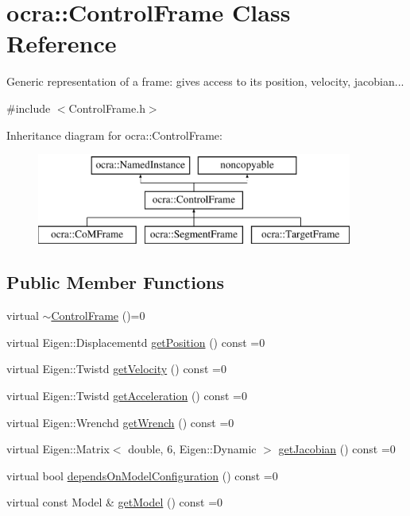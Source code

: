 \hypertarget{classocra_1_1ControlFrame}{}\section{ocra\+:\+:Control\+Frame Class Reference}
\label{classocra_1_1ControlFrame}


Generic representation of a frame\+: gives access to its position, velocity, jacobian...  




{\ttfamily \#include $<$Control\+Frame.\+h$>$}

Inheritance diagram for ocra\+:\+:Control\+Frame\+:\begin{figure}[H]
\begin{center}
\leavevmode
\includegraphics[height=3.000000cm]{db/d33/classocra_1_1ControlFrame}
\end{center}
\end{figure}
\subsection*{Public Member Functions}
\begin{DoxyCompactItemize}
\item 
virtual \hyperlink{classocra_1_1ControlFrame_abfbbf55462bf1b256f12316ae3abe357}{$\sim$\+Control\+Frame} ()=0
\item 
virtual Eigen\+::\+Displacementd \hyperlink{classocra_1_1ControlFrame_aaadbbfbcdd5b8e197a0f181ffb2fdcbe}{get\+Position} () const =0
\item 
virtual Eigen\+::\+Twistd \hyperlink{classocra_1_1ControlFrame_a398df839f75886867c86a8e70ac9bf24}{get\+Velocity} () const =0
\item 
virtual Eigen\+::\+Twistd \hyperlink{classocra_1_1ControlFrame_a0ceb7cd7c3fe90fa0ef311b96a6f5c88}{get\+Acceleration} () const =0
\item 
virtual Eigen\+::\+Wrenchd \hyperlink{classocra_1_1ControlFrame_a069aaf1eab98598fbffee263fcde0c56}{get\+Wrench} () const =0
\item 
virtual Eigen\+::\+Matrix$<$ double, 6, Eigen\+::\+Dynamic $>$ \hyperlink{classocra_1_1ControlFrame_a14e0b855979be5dbd360314f25191e77}{get\+Jacobian} () const =0
\item 
virtual bool \hyperlink{classocra_1_1ControlFrame_a65833d1f3f42bc8d452f8b1fb671e142}{depends\+On\+Model\+Configuration} () const =0
\item 
virtual const Model \& \hyperlink{classocra_1_1ControlFrame_ab8a1e5e3d96d7524112b4c88bf0bc5ee}{get\+Model} () const =0
\end{DoxyCompactItemize}
